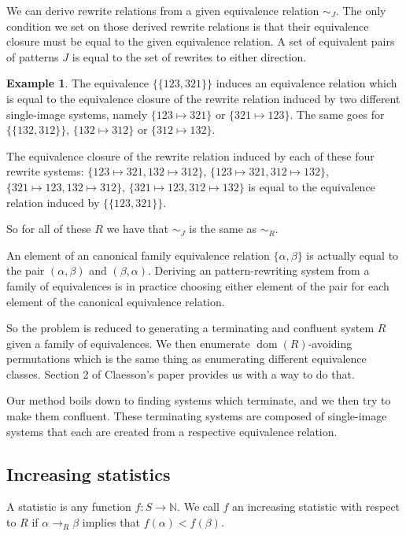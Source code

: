 \documentclass[openany, a4paper, 11pt, english]{article}
\newcommand{\patternrule}{ \mapsto \!}
\theoremstyle{definition}
\newtheorem{example}[theorem]{Example}
\newcommand{\Sym}{S}
\DeclareMathOperator{\dom}{dom}
\begin{document}
We can derive rewrite relations from a given equivalence relation $\sim_J$.
The only condition we set on those derived rewrite relations is that their
equivalence closure must be equal to the given equivalence relation.
A set of equivalent pairs of patterns $J$ is equal to the set of rewrites to
either direction. 
\begin{example}
    The equivalence $\{ \{123, 321 \} \}$ induces an equivalence relation which is
    equal to the equivalence closure of the rewrite relation induced by two
    different single-image systems, namely $\{123 \patternrule 321\}$ or $\{321
    \patternrule 123\}$. The same goes for $\{ \{ 132, 312 \} \}$, $\{132 \patternrule
    312\}$ or $\{312 \patternrule 132\}$.

    The equivalence closure of the rewrite relation induced by each of these
    four rewrite systems: $\{123 \patternrule 321, 132 \patternrule 312\}$, $\{123
    \patternrule 321, 312 \patternrule 132\}$, $\{321 \patternrule 123, 132
    \patternrule 312\}$, $\{321 \patternrule 123, 312 \patternrule 132\}$ is
    equal to the equivalence relation induced by $\{ \{ 123, 321 \} \}$.

    So for all of these $R$ we have that $\sim_J$ is the same as $\sim_R$.
\end{example}

An element of an canonical family equivalence relation $\{ \alpha, \beta \}$ is
actually equal to the pair $(\alpha, \beta)$ and $(\beta, \alpha)$.
Deriving an pattern-rewriting system from a family of equivalences is in
practice choosing either element of the pair for each element of the canonical
equivalence relation.

So the problem is reduced to generating a terminating and confluent system $R$
given a family of equivalences. We then enumerate $\dom(R)$-avoiding
permutations which is the same thing as enumerating different equivalence
classes.  Section 2 of Claesson's paper provides us with a way to do that.
\cite{claesson:2021}

Our method boils down to finding systems which terminate, and we then try to
make them confluent. These terminating systems are composed of single-image
systems that each are created from a respective equivalence relation.

\subsection{Increasing statistics}
A statistic is any function $f : \Sym \to \mathbb{N}$. We call $f$ an increasing
statistic with respect to $R$ if $\alpha \to_R \beta$ implies that $f(\alpha) < f(\beta)$.
\end{document}
